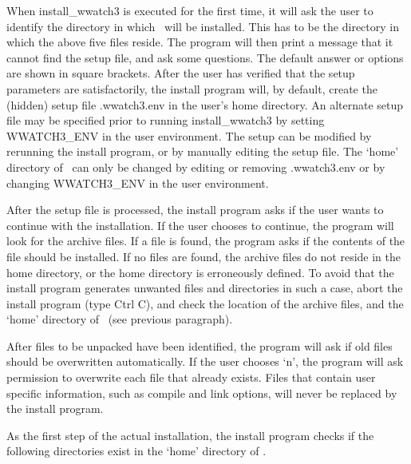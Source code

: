 When {\file install\_wwatch3} is executed for the first time, it will ask the
user to identify the directory in which \ws\ will be installed. This has to be
the directory in which the above five files reside. The program will then
print a message that it cannot find the setup file, and ask some
questions. The default answer or options are shown in square brackets. After
the user has verified that the setup parameters are satisfactorily, the
install program will, by default, create the (hidden) setup file {\file
  .wwatch3.env} in the user's home directory.  An alternate setup file may be
specified prior to running {\file install\_wwatch3} by setting {\code
  WWATCH3\_ENV} in the user environment.  The setup can be modified by
rerunning the install program, or by manually editing the setup file. The
`home' directory of \ws\ can only be changed by editing or removing {\file
  .wwatch3.env} or by changing {\code WWATCH3\_ENV} in the user environment.

After the setup file is processed, the install program asks if the user wants
to continue with the installation. If the user chooses to continue, the
program will look for the archive files. If a file is found, the program asks
if the contents of the file should be installed. If no files are found, the
archive files do not reside in the home directory, or the home directory is
erroneously defined. To avoid that the install program generates unwanted
files and directories in such a case, abort the install program (type Ctrl C),
and check the location of the archive files, and the `home' directory of \ws\
(see previous paragraph).

After files to be unpacked have been identified, the program will ask if old
files should be overwritten automatically. If the user chooses `n', the
program will ask permission to overwrite each file that already exists. Files
that contain user specific information, such as compile and link options, will
never be replaced by the install program.

As the first step of the actual installation, the install program checks if
the following directories exist in the `home' directory of \ws.
 
\begin{dlist}
\dit{exe }{\ws\ executables.}
\end{dlist}

